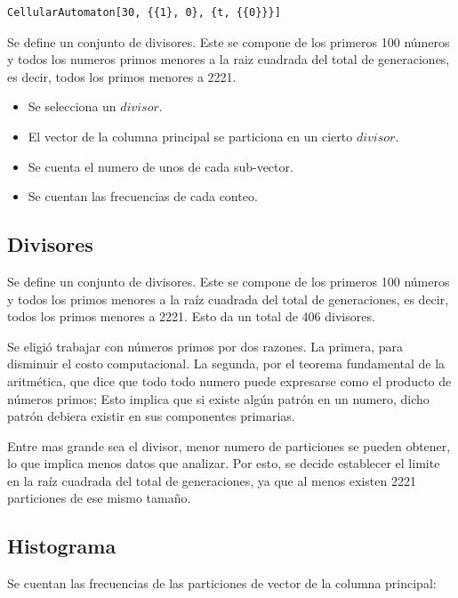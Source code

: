 \documentclass[12pt,twoside]{article}
\begin{document}
\begin{lstlisting}[style=modernMathematica, label=fun:ca, caption={Función extractora de la columna principal}]
CellularAutomaton[30, {{1}, 0}, {t, {{0}}}]
\end{lstlisting}

	Se define un conjunto de divisores. Este se compone de los primeros 100 números y todos los numeros primos menores a la raiz cuadrada del total de generaciones, es decir, todos los primos menores a 2221.

	\begin{itemize}
		\item Se selecciona un $divisor$.
		\item El vector de la columna principal se particiona en un cierto $divisor$.
		\item Se cuenta el numero de unos de cada sub-vector.
		\item Se cuentan las frecuencias de cada conteo.
	\end{itemize}

	\subsection{Divisores}
	
	Se define un conjunto de divisores. Este se compone de los primeros 100 números y todos los primos menores a la raíz cuadrada del total de generaciones, es decir, todos los primos menores a 2221.  Esto da un total de 406 divisores.
	
	Se eligió trabajar con números primos por dos razones. La primera, para disminuir el costo computacional. La segunda, por el teorema fundamental de la aritmética, que dice que todo todo numero puede expresarse como el producto de números primos; Esto implica que si existe algún patrón en un numero, dicho patrón debiera existir en sus componentes primarias.
	
	Entre mas grande sea el divisor, menor numero de particiones se pueden obtener, lo que implica menos datos que analizar. Por esto, se decide establecer el limite en la raíz cuadrada del total de generaciones, ya que al menos existen 2221 particiones de ese mismo tamaño.
	
	\subsection{Histograma}
	
	Se cuentan las frecuencias de las particiones de vector de la columna principal:
	
\end{document}
